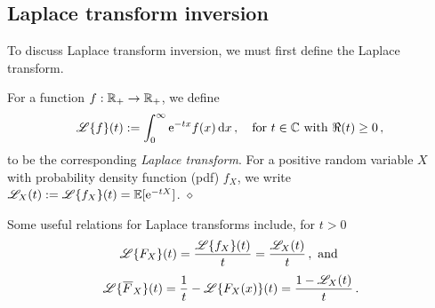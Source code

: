 \subsection{Laplace transform inversion} \label{sec:laplace_inversion}

To discuss Laplace transform inversion, we must first define the Laplace transform.

\begin{definition} \label{def:TransformDefs} For a function $f : \mathbb{R}_+ \to \mathbb{R}_+$, we define
\[
	\mathscr{L}\{f\}(t) := \int_{0}^{\infty} \mathrm{e}^{-t x} f(x) \mathop{}\!\mathrm{d} x\,, \quad \text{for } t \in \mathbb{C} \text{ with } \Re(t) \ge 0 \,, \\
\]
to be the corresponding \emph{Laplace transform}.
For a positive random variable $X$ with probability density function (pdf) $f_X$, we write $\mathscr{L}_{X}(t) := \mathscr{L}\{f_X\}(t) = \operatorname{{\mathbb E}}[\mathrm{e}^{-tX}]$. \hfill $\diamond$
\end{definition}
Some useful relations for Laplace transforms include, for $t>0$
\[ \mathscr{L}\{ F_X \}(t) = \frac{\mathscr{L}\{f_X\}(t)}{t} = \frac{\mathscr{L}_{X}(t)}{t} \,, \text{ and } \]
\[ \LT{ \Ftail_X }(t) = \frac1t - \LT{F_X(x) }(t) = \frac{1 - \LTsub{X}(t)}{t}  \,. \]



